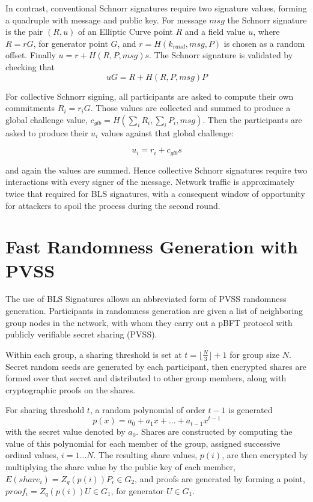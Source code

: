 \documentclass[article,oneside]{memoir}
\begin{document}
In contrast, conventional Schnorr signatures require two signature values, forming a quadruple with message and public key. For message $msg$ the Schnorr signature is the pair $(R,u)$ of an Elliptic Curve point $R$ and a field value $u$, where $R = r G$, for generator point $G$, and $r = H(k_{rand}, msg, P)$ is chosen as a random offset. Finally $u = r + H(R,P,msg) s$. The Schnorr signature is validated by checking that $$u G = R + H(R, P, msg) P$$

For collective Schnorr signing, all participants are asked to compute their own commitments $R_i = r_i G$. Those values are collected and summed to produce a global challenge value, $c_{glb} = H(\sum_i R_i, \sum_i P_i, msg)$.  Then the participants are asked to produce their $u_i$ values against that global challenge:

$$u_i = r_i + c_{glb} s$$

and again the values are summed. Hence collective Schnorr signatures require two interactions with every signer of the message. Network traffic is approximately twice that required for BLS signatures, with a consequent window of opportunity for attackers to spoil the process during the second round.

\chapter{Fast Randomness Generation with PVSS}

The use of BLS Signatures allows an abbreviated form of PVSS randomness generation. Participants in randomness generation are given a list of neighboring group nodes in the network, with whom they carry out a pBFT protocol with publicly verifiable secret sharing (PVSS). 

Within each group, a sharing threshold is set at $t = \lfloor \frac{N}{3} \rfloor + 1$ for group size $N$. Secret random seeds are generated by each participant, then encrypted shares are formed over that secret and distributed to other group members, along with cryptographic proofs on the shares.

For sharing threshold $t$, a random polynomial of order $t-1$ is generated $$p(x) = a_0 + a_1 x + ... + a_{t-1} x^{t-1}$$ with the secret value denoted by $a_0$.  Shares are constructed by computing the value of this polynomial for each member of the group, assigned successive ordinal values, $i = 1 ... N$. The resulting share values, $p(i)$, are then encrypted by multiplying the share value by the public key of each member, $E(share_i) = Z_q(p(i)) P_i \in G_2$, and proofs are generated by forming a point, $proof_i = Z_q(p(i)) U \in G_1$, for generator $U \in G_1$. 
\end{document}

